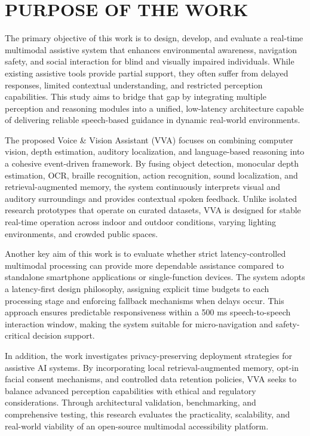 \medskip
\section{PURPOSE OF THE WORK}

The primary objective of this work is to design, develop, and evaluate a real-time multimodal assistive system that enhances environmental awareness, navigation safety, and social interaction for blind and visually impaired individuals. While existing assistive tools provide partial support, they often suffer from delayed responses, limited contextual understanding, and restricted perception capabilities. This study aims to bridge that gap by integrating multiple perception and reasoning modules into a unified, low-latency architecture capable of delivering reliable speech-based guidance in dynamic real-world environments.

The proposed Voice \& Vision Assistant (VVA) focuses on combining computer vision, depth estimation, auditory localization, and language-based reasoning into a cohesive event-driven framework. By fusing object detection, monocular depth estimation, OCR, braille recognition, action recognition, sound localization, and retrieval-augmented memory, the system continuously interprets visual and auditory surroundings and provides contextual spoken feedback. Unlike isolated research prototypes that operate on curated datasets, VVA is designed for stable real-time operation across indoor and outdoor conditions, varying lighting environments, and crowded public spaces.

Another key aim of this work is to evaluate whether strict latency-controlled multimodal processing can provide more dependable assistance compared to standalone smartphone applications or single-function devices. The system adopts a latency-first design philosophy, assigning explicit time budgets to each processing stage and enforcing fallback mechanisms when delays occur. This approach ensures predictable responsiveness within a 500 ms speech-to-speech interaction window, making the system suitable for micro-navigation and safety-critical decision support.

In addition, the work investigates privacy-preserving deployment strategies for assistive AI systems. By incorporating local retrieval-augmented memory, opt-in facial consent mechanisms, and controlled data retention policies, VVA seeks to balance advanced perception capabilities with ethical and regulatory considerations. Through architectural validation, benchmarking, and comprehensive testing, this research evaluates the practicality, scalability, and real-world viability of an open-source multimodal accessibility platform.

